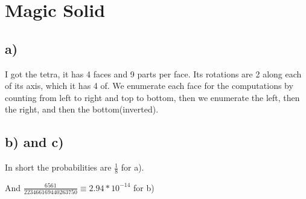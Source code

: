 \section{Magic Solid}

\subsection*{a)} I got the tetra, it has 4 faces and 9 parts per face. Its rotations are 2 along each of its axis, which it has 4 of. We enumerate each face for the computations by counting from left to right and top to bottom, then we enumerate the left, then the right, and then the bottom(inverted).

\subsection*{b) and c)}

In short the probabilities are $\frac{1}{8}$ for a).

And $\frac{6561}{223466169440263750} \equiv 2.94*10^{-14}$ for b)

